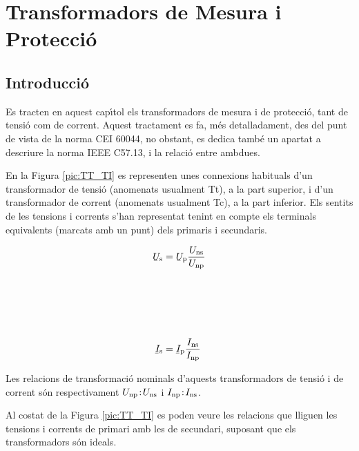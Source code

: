 \chapter{Transformadors de Mesura i Protecci\'{o}}\label{sec:tr_mes_prot}


\section{Introducci\'{o}}
Es tracten en aquest cap\'{\i}tol els transformadors de
mesura i de protecci\'{o}, tant de tensi\'{o} com de corrent. Aquest
tractament es fa, m\'{e}s detalladament, des del punt de vista de la norma \textsf{CEI 60044}, no obstant, es dedica tamb\'{e} un
apartat a descriure la norma  \textsf{IEEE C57.13}, i la
relaci\'{o} entre ambdues.

En la Figura \vref{pic:TT_TI} es representen unes connexions
habituals d'un transformador de tensi\'{o} (anomenats usualment Tt), a
la part superior, i d'un transformador de corrent (anomenats
usualment Tc), a la part inferior. Els sentits de les tensions
i corrents s'han representat tenint en compte els terminals
equivalents (marcats amb un punt) dels primaris i secundaris.

\hfill
\begin{minipage}[b]{90mm}
    \hspace{1.5cm}
    
    \label{pic:TT_TI}
\end{minipage}
\hfill
\begin{minipage}[b][70mm][t]{50mm}
   \begin{align}
      \cmplx{U}\ped{s} &= \cmplx{U}\ped{p} \frac{U\ped{ns}}{U\ped{np}}
      \\[24mm]
      \cmplx{I}\ped{s} &= \cmplx{I}\ped{p} \frac{I\ped{ns}}{I\ped{np}}
   \end{align}
\end{minipage}

Les relacions de transformaci\'{o} nominals d'aquests transformadors de
tensi\'{o} i de corrent s\'{o}n respectivament $U_\mathrm{np}\!:\!U_\mathrm{ns}$ i
$I_\mathrm{np}\!:\!I_\mathrm{ns}$.

Al costat de la Figura
\vref{pic:TT_TI} es poden veure les relacions que lliguen les
tensions i corrents de primari amb les de secundari, suposant que
els transformadors s\'{o}n ideals.


